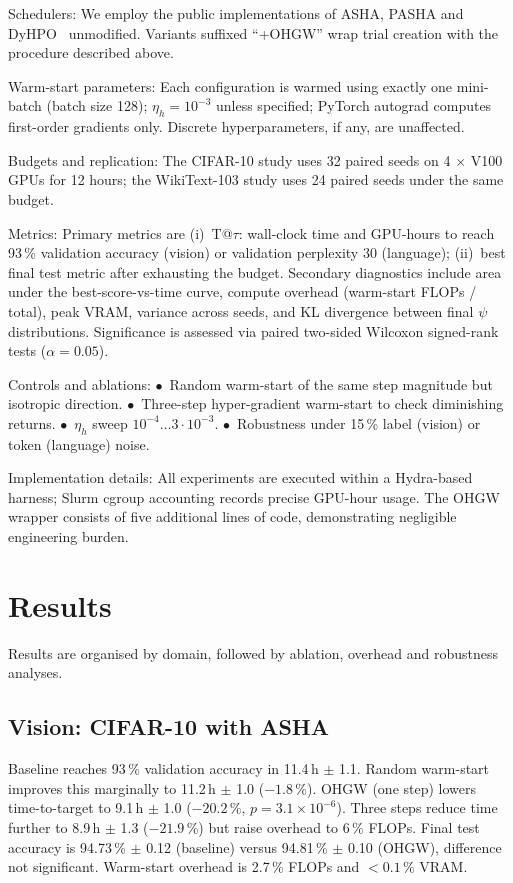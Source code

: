 \documentclass{article}
\begin{document}
Schedulers: We employ the public implementations of ASHA, PASHA and DyHPO~\cite{bohdal-2022-pasha,wistuba-2022-supervising} unmodified. Variants suffixed ``+OHGW'' wrap trial creation with the procedure described above.

Warm-start parameters: Each configuration is warmed using exactly one mini-batch (batch size 128); \(\eta_h = 10^{-3}\) unless specified; PyTorch autograd computes first-order gradients only. Discrete hyperparameters, if any, are unaffected.

Budgets and replication: The CIFAR-10 study uses 32 paired seeds on 4 $\times$ V100 GPUs for 12 hours; the WikiText-103 study uses 24 paired seeds under the same budget.

Metrics: Primary metrics are (i)~T@$\tau$: wall-clock time and GPU-hours to reach 93\,\% validation accuracy (vision) or validation perplexity 30 (language); (ii)~best final test metric after exhausting the budget. Secondary diagnostics include area under the best-score-vs-time curve, compute overhead (warm-start FLOPs / total), peak VRAM, variance across seeds, and KL divergence between final \(\psi\) distributions. Significance is assessed via paired two-sided Wilcoxon signed-rank tests (\(\alpha = 0.05\)).

Controls and ablations: \(\bullet\)\ Random warm-start of the same step magnitude but isotropic direction. \(\bullet\)\ Three-step hyper-gradient warm-start to check diminishing returns. \(\bullet\)\ \(\eta_h\) sweep \(10^{-4} \ldots 3\cdot 10^{-3}\). \(\bullet\)\ Robustness under 15\,\% label (vision) or token (language) noise.

Implementation details: All experiments are executed within a Hydra-based harness; Slurm cgroup accounting records precise GPU-hour usage. The OHGW wrapper consists of five additional lines of code, demonstrating negligible engineering burden.

\section{Results}
Results are organised by domain, followed by ablation, overhead and robustness analyses.

\subsection{Vision: CIFAR-10 with ASHA}
Baseline reaches 93\,\% validation accuracy in 11.4\,h $\pm$ 1.1. Random warm-start improves this marginally to 11.2\,h $\pm$ 1.0 ($-1.8\,\%$). OHGW (one step) lowers time-to-target to 9.1\,h $\pm$ 1.0 ($-20.2\,\%$, \(p = 3.1 \times 10^{-6}\)). Three steps reduce time further to 8.9\,h $\pm$ 1.3 ($-21.9\,\%$) but raise overhead to 6\,\% FLOPs. Final test accuracy is 94.73\,\% $\pm$ 0.12 (baseline) versus 94.81\,\% $\pm$ 0.10 (OHGW), difference not significant. Warm-start overhead is 2.7\,\% FLOPs and $<0.1\,\%$ VRAM\@.
\end{document}

